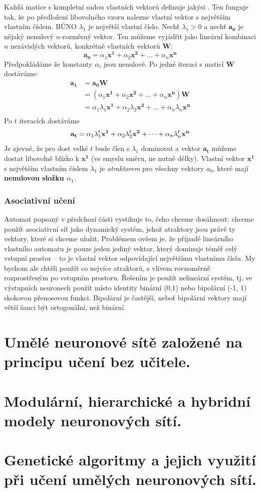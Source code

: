 \documentclass[11pt]{report} %
\renewcommand{\vec}[1]{\mathbf{#1}}
\begin{document}
Každá matice s kompletní sadou vlastních vektorů definuje jakýsi . Ten funguje tak, že po předložení libovolného vzoru nalezne vlastní vektor s největším vlastním číslem. BÚNO $\lambda_1$ je největší vlastní číslo. Nechť $\lambda_1 > 0$ a nechť $\vec{a_0}$ je nějaký nenulový $n$-rozměrný vektor. Ten můžeme vyjádřit jako lineární kombinaci $n$ nezávislých vektorů, konkrétně vlastních vektorů $\vec{W}$:
$$\vec{a_0} = \alpha_1\vec{x^1} + \alpha_2\vec{x^2} + \dots + \alpha_n\vec{x^n}$$ 
Předpokládáme že konstanty $\alpha_i$ jsou nenulové. Po jedné iteraci s maticí $\vec{W}$ dostáváme:
\begin{align*}
\vec{a_1} &= \vec{a_0}\vec{W} \\
&= (\alpha_1\vec{x^1} + \alpha_2\vec{x^2} + \dots + \alpha_n\vec{x^n})\vec{W} \\
&= \alpha_1\lambda_1\vec{x^1} + \alpha_2\lambda_2\vec{x^2} + \dots + \alpha_n\lambda_n\vec{x^n}\\
\end{align*}
Po $t$ iteracích dostáváme
$$\vec{a_t} = \alpha_1\lambda_1^t\vec{x^1} + \alpha_2\lambda_2^t\vec{x^2} + \dots + \alpha_n\lambda_n^t\vec{x^n}\\$$
Je zjevné, že pro dost velké $t$ bude člen s $\lambda_1$ dominovat a vektor $\vec{a_t}$ můžeme dostat libovolně blízko k $\vec{x^1}$ (ve smyslu směru, ne nutně délky). Vlastní vektor $\vec{x^1}$ s největším vlastním číslem $\lambda_1$ je \textit{atraktorem} pro všechny vektory $a_0$, které mají \textbf{nenulovou složku $\alpha_1$}.

\subsubsection{Asociativní učení}
Automat popsaný v předchozí části vystihuje to, čeho chceme dosáhnout: chceme použít asociativní síť jako dynamický systém, jehož atraktory jsou právě ty vektory, které si chceme uložit. Problémem ovšem je, že případě lineárního vlastního automatu je pouze jeden jediný vektor, který dominuje téměř celý vstupní prostor -- to je vlastní vektor odpovídající největšímu vlastnímu číslu. My bychom ale chtěli použít co nejvíce atraktorů, s vlivem rovnoměrně rozprostřeným po vstupním prostoru. Řešením je použít nelineární systém, tj. ve výstupních neuronech použít místo identity binární (0,1) nebo bipolární (-1, 1) skokovou přenosovou funkci. Bipolární je častější, neboť bipolární vektory mají větší šanci být ortogonální, než binární. 

\section{Umělé neuronové sítě založené na principu učení bez učitele.}
\section{Modulární, hierarchické a hybridní modely neuronových sítí.}
\section{Genetické algoritmy a jejich využití při učení umělých neuronových sítí.}
\end{document}
